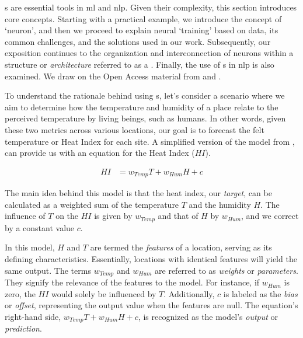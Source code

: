 \label{02_neural_networks}


\neuralNetwork{}s are essential tools in \gls{ml} and \gls{nlp}. Given their complexity, this section introduces core concepts. 
Starting with a practical example, we introduce the concept of `neuron', and then we proceed to explain neural `training' based on data, its common challenges, and the solutions used in our work.
Subsequently, our exposition continues to the organization and interconnection of neurons within a structure or \emph{architecture} referred to as a \neuralNetwork{}. Finally, the use of \neuralNetwork{}s in \gls{nlp} is also examined. We draw on the Open Access material from  and .

\label{02_nn_motivating_example}


To understand the rationale behind using \neuralNetwork{}s, let's consider a scenario where we aim to determine how the temperature and humidity of a place relate to the perceived temperature by living beings, such as humans. In other words, given these two metrics across various locations, our goal is to forecast the felt temperature or Heat Index for each site. A simplified version of the model from , can provide us with an equation for the Heat Index ($HI$).

\begin{align*}
    HI &= w_{Temp} T + w_{Hum} H + c
\end{align*}


The main idea behind this model is that the heat index, our \emph{target}, can be calculated as a weighted sum of the temperature $T$ and the humidity $H$. The influence of $T$ on the $HI$ is given by $w_{Temp}$ and that of $H$ by $w_{Hum}$, and we correct by a constant value $c$. 

In this model, $H$ and $T$ are termed the \emph{features} of a location, serving as its defining characteristics. Essentially, locations with identical features will yield the same output. The terms $w_{Temp}$ and $w_{Hum}$ are referred to as \emph{weights} or \emph{parameters}. They signify the relevance of the features to the model. For instance, if $w_{Hum}$ is zero, the $HI$ would solely be influenced by $T$. Additionally, $c$ is labeled as the \emph{bias} or \emph{offset}, representing the output value when the features are null. The equation's right-hand side, $w_{Temp} T + w_{Hum} H + c$, is recognized as the model's \emph{output} or \emph{prediction}.


